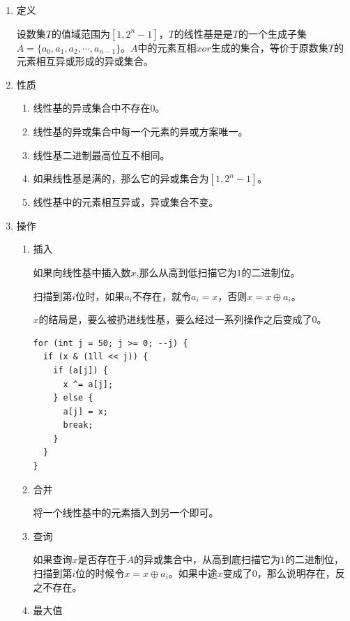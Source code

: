 \documentclass[11pt]{article}
\begin{document}
\begin{enumerate}
\item 定义
\label{sec-1-2-2-1}

设数集\(T\)的值域范围为\([1,2^n-1]\)，\(T\)的线性基是是\(T\)的一个生成子集\(A=\{a_0,a_1,a_2,\cdots,a_{n-1}\}\)。\(A\)中的元素互相\(xor\)生成的集合，等价于原数集\(T\)的元素相互异或形成的异或集合。

\item 性质
\label{sec-1-2-2-2}

\begin{enumerate}
\item 线性基的异或集合中不存在\(0\)。
\item 线性基的异或集合中每一个元素的异或方案唯一。
\item 线性基二进制最高位互不相同。
\item 如果线性基是满的，那么它的异或集合为\([1,2^n-1]\)。
\item 线性基中的元素相互异或，异或集合不变。
\end{enumerate}

\item 操作
\label{sec-1-2-2-3}
\begin{enumerate}
\item 插入
\label{sec-1-2-2-3-1}

如果向线性基中插入数\(x\),那么从高到低扫描它为\(1\)的二进制位。

扫描到第\(i\)位时，如果\(a_i\)不存在，就令\(a_i=x\)，否则\(x=x \oplus a_i\)。

\(x\)的结局是，要么被扔进线性基，要么经过一系列操作之后变成了\(0\)。

\begin{verbatim}
for (int j = 50; j >= 0; --j) {
  if (x & (1ll << j)) {
    if (a[j]) {
      x ^= a[j];
    } else {
      a[j] = x;
      break;
    }
  }
}
\end{verbatim}

\item 合并
\label{sec-1-2-2-3-2}

将一个线性基中的元素插入到另一个即可。

\item 查询
\label{sec-1-2-2-3-3}

如果查询\(x\)是否存在于\(A\)的异或集合中，从高到底扫描它为\(1\)的二进制位，扫描到第\(i\)位的时候令\(x=x \oplus a_i\)。如果中途\(x\)变成了\(0\)，那么说明存在，反之不存在。

\item 最大值
\label{sec-1-2-2-3-4}


\end{enumerate}
\end{enumerate}
\end{document}
